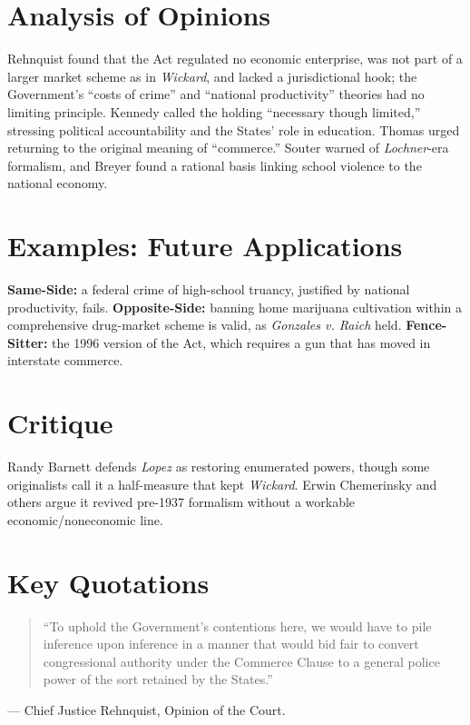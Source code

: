 \documentclass[12pt]{article}
\begin{document}
\section{Analysis of Opinions}
Rehnquist found that the Act regulated no economic enterprise, was not part of a larger market scheme as in \textit{Wickard}, and lacked a jurisdictional hook; the Government's ``costs of crime'' and ``national productivity'' theories had no limiting principle. Kennedy called the holding ``necessary though limited,'' stressing political accountability and the States' role in education. Thomas urged returning to the original meaning of ``commerce.'' Souter warned of \textit{Lochner}-era formalism, and Breyer found a rational basis linking school violence to the national economy.

\section{Examples: Future Applications}
\textbf{Same-Side:} a federal crime of high-school truancy, justified by national productivity, fails. \textbf{Opposite-Side:} banning home marijuana cultivation within a comprehensive drug-market scheme is valid, as \textit{Gonzales v. Raich} held. \textbf{Fence-Sitter:} the 1996 version of the Act, which requires a gun that has moved in interstate commerce.

\section{Critique}
Randy Barnett defends \textit{Lopez} as restoring enumerated powers, though some originalists call it a half-measure that kept \textit{Wickard}. Erwin Chemerinsky and others argue it revived pre-1937 formalism without a workable economic/noneconomic line.

\section{Key Quotations}
\begin{quote}
``To uphold the Government's contentions here, we would have to pile inference upon inference in a manner that would bid fair to convert congressional authority under the Commerce Clause to a general police power of the sort retained by the States.''
\end{quote}
\noindent --- Chief Justice Rehnquist, Opinion of the Court.
\end{document}
